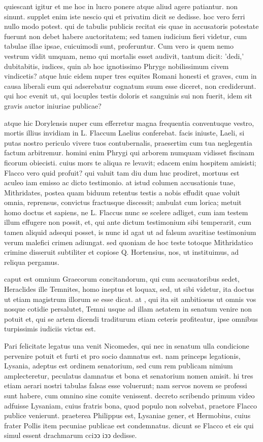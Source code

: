  quiescant igitur et me hoc in lucro ponere atque aliud agere patiantur. non sinunt. supplet enim iste nescio qui et privatim dicit se dedisse. hoc vero ferri nullo modo potest. qui de tabulis publicis recitat eis quae in accusatoris potestate fuerunt non debet habere auctoritatem; sed tamen iudicium fieri videtur, cum tabulae illae ipsae, cuicuimodi sunt, proferuntur. Cum vero is quem nemo vestrum vidit umquam, nemo qui mortalis esset audivit, tantum dicit: 'dedi,' dubitabitis, iudices, quin ab hoc ignotissimo Phryge nobilissimum civem vindicetis? atque huic eidem nuper tres equites Romani honesti et graves, cum in causa liberali eum qui adserebatur cognatum suum esse diceret, non crediderunt. qui hoc evenit ut, qui locuples testis doloris et sanguinis sui non fuerit, idem sit gravis auctor iniuriae publicae?

 atque hic Dorylensis nuper cum efferretur magna frequentia conventuque vestro, mortis illius invidiam in L. Flaccum Laelius conferebat. facis iniuste, Laeli, si putas nostro periculo vivere tuos contubernalis, praesertim cum tua neglegentia factum arbitremur. homini enim Phrygi qui arborem numquam vidisset fiscinam ficorum obiecisti. cuius mors te aliqua re levavit; edacem enim hospitem amisisti; Flacco vero quid profuit? qui valuit tam diu dum huc prodiret, mortuus est aculeo iam emisso ac dicto testimonio. at istud columen accusationis tuae, Mithridates, postea quam biduum retentus testis a nobis effudit quae voluit omnia, reprensus, convictus fractusque discessit; ambulat cum lorica; metuit homo doctus et sapiens, ne L. Flaccus nunc se scelere adliget, cum iam testem illum effugere non possit, et, qui ante dictum testimonium sibi temperarit, cum tamen aliquid adsequi posset, is nunc id agat ut ad falsum avaritiae testimonium verum malefici crimen adiungat. sed quoniam de hoc teste totoque Mithridatico crimine disseruit subtiliter et copiose Q. Hortensius, nos, ut instituimus, ad reliqua pergamus.

 caput est omnium Graecorum concitandorum, qui cum accusatoribus sedet, Heraclides ille Temnites, homo ineptus et loquax, sed, ut sibi videtur, ita doctus ut etiam magistrum illorum se esse dicat. at , qui ita sit ambitiosus ut omnis vos nosque cotidie persalutet, Temni usque ad illam aetatem in senatum venire non potuit et, qui se artem dicendi traditurum etiam ceteris profiteatur, ipse omnibus turpissimis iudiciis victus est.

 Pari felicitate legatus una venit Nicomedes, qui nec in senatum ulla condicione pervenire potuit et furti et pro socio damnatus est. nam princeps legationis, Lysania, adeptus est ordinem senatorium, sed cum rem publicam nimium amplecteretur, peculatus damnatus et bona et senatorium nomen amisit. hi tres etiam aerari nostri tabulas falsas esse voluerunt; nam servos novem se professi sunt habere, cum omnino sine comite venissent. decreto scribendo primum video adfuisse Lysaniam, cuius fratris bona, quod populo non solvebat, praetore Flacco publice venierunt. praeterea Philippus est, Lysaniae gener, et Hermobius, cuius frater Pollis item pecuniae publicae est condemnatus. dicunt se Flacco et eis qui simul essent drachmarum cciↄↄ iↄↄ dedisse.

